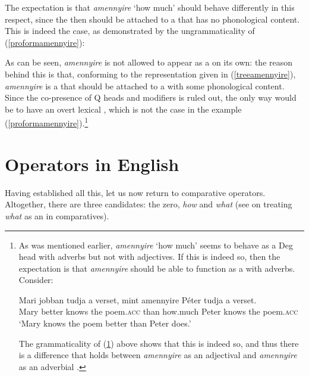 The expectation is that \textit{amennyire} `how much' should behave differently in this respect, since the   then should be attached to a  that has no phonological content. This is indeed the case, as demonstrated by the ungrammaticality of (\ref{proformamennyire}):

\z

As can be seen, \textit{amennyire} is not allowed to appear as a  on its own: the reason behind this is that, conforming to the representation given in (\ref{treeamennyire}), \textit{amennyire} is a   that should be attached to a  with some phonological content. Since the co-presence of Q heads and  modifiers is ruled out, the only way would be to have an overt lexical , which is not the case in the example (\ref{proformamennyire}).\footnote{As was mentioned earlier, \textit{amennyire} `how much' seems to behave as a Deg head with adverbs but not with adjectives. If this is indeed so, then the expectation is that \textit{amennyire} should be able to function as a  with adverbs. Consider:

\ea \gll Mari	jobban tudja a verset, mint	amennyire	Péter	tudja	a verset. \label{proformamennyireadverb}\\
Mary better	knows	the	poem.\textsc{acc} than how.much	Peter	knows	the poem.\textsc{acc}\\
\glt `Mary knows the poem better than Peter does.'
\z
	
The grammaticality of (\ref{proformamennyireadverb}) above shows that this is indeed so, and thus there is a difference that holds between \textit{amennyire} as an adjectival  and \textit{amennyire} as an adverbial .}

\section{Operators in English} \label{sec:3operatorsinenglish}
Having established all this, let us now return to  comparative operators. Altogether, there are three candidates: the zero, \textit{how} and \textit{what} (see \citealt{chomsky1977} on treating \textit{what} as an  in comparatives).

